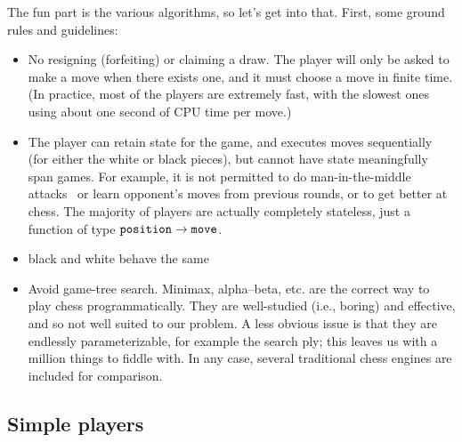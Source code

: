 \documentclass[10pt,preprint,twocolumn]{acmart}
\begin{document}
The fun part is the various algorithms, so let's get into that. First,
some ground rules and guidelines:
\begin{itemize}
\item No resigning (forfeiting) or claiming a draw. The player will
  only be asked to make a move when there exists one, and it must
  choose a move in finite time. (In practice, most of the players are
  extremely fast, with the slowest ones using about one second of
  CPU time per move.)
\item The player can retain state for the game, and executes moves
  sequentially (for either the white or black pieces), but cannot have
  state meaningfully span games. For example, it is not permitted to
  do man-in-the-middle attacks~\cite{blind} or learn opponent's moves
  from previous rounds, or to get better at chess. The majority of
  players are actually completely stateless, just a function of type
  ${\tt position} \rightarrow {\tt move}$.
\item black and white behave the same
\item Avoid game-tree search. Minimax, alpha--beta, etc. are the
  correct way to play chess programmatically. They are well-studied
  (i.e., boring) and effective, and so not well suited to our problem.
  A less obvious issue is that they are endlessly parameterizable, for
  example the search ply; this leaves us with a million things to
  fiddle with. In any case, several traditional chess engines are
  included for comparison.
\end{itemize}


\subsection{Simple players}
\end{document}
